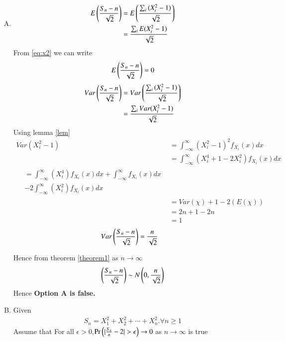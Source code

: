 \documentclass[journal,12pt,twocolumn]{IEEEtran}
\begin{document}
 \begin{enumerate}[(A)]
\item \begin{align}
    E\left(\frac{S_{n}-n}{\sqrt{2}}\right)&=E\left(\frac{\sum_{i}{(X_{i}^{2}-1)}}{\sqrt{2}}\right)\\
    &={\frac{\sum_{i}E{(X_{i}^{2}-1)}}{\sqrt{2}}}\label{eq:expectation}
\end{align}
From \eqref{eq:x2} we can write
\begin{align}
    E\left(\frac{S_{n}-n}{\sqrt{2}}\right)=0
\end{align}
\begin{align}
    Var\left(\frac{S_{n}-n}{\sqrt{2}}\right)&=Var\left(\frac{\sum_{i}{(X_{i}^{2}-1)}}{\sqrt{2}}\right)\\
    &={\frac{\sum_{i}Var{(X_{i}^{2}-1)}}{\sqrt{2}}}
\end{align}
Using lemma \ref{lem}
\begin{align}
 Var(X_{i}^2-1)
  &=\int_{-\infty}^{\infty}(X_{i}^2-1)^2 f_{X_{i}}(x)dx\\  &=\int_{-\infty}^{\infty}(X_{i}^4+1-2X_{i}^{2})f_{X_{i}}(x)dx\\
  \begin{split}
      &=\int_{-\infty}^{\infty}(X_{i}^4)f_{X_{i}}(x)dx+\int_{-\infty}^{\infty}f_{X_{i}}(x)dx\\
      &-2\int_{-\infty}^{\infty}(X_{i}^{2})f_{X_{i}}(x)dx
  \end{split}
  \\&=Var(\chi)+1-2(E(\chi))
  \\&=2n+1-2n
\\ &=1\label{eq:var}
 
\end{align}
\begin{align}
    Var\left(\frac{S_{n}-n}{\sqrt{2}}\right)&=\frac{n}{\sqrt{2}}    
\end{align}

Hence from theorem \ref{theorem1} as $n \to \infty$
\begin{align}
    \left(\frac{S_{n}-n}{\sqrt{2}}\right)\sim N\left(0,\frac{n}{\sqrt{2}}\right)
\end{align}
Hence \textbf{Option A is false.}



\item Given 
\begin{align}
    S_{n}=X_{1}^2+X_{2}^2+\cdots+X_{n}^2.\forall n\geq 1
\end{align}
Assume that For all $\epsilon > 0$,$\Pr{\ensuremath{\left(\vert\frac{S_n}{n}-2\vert>\epsilon\right)}}\to 0$ as $n \to \infty$ is true


\end{enumerate}
\end{document}
